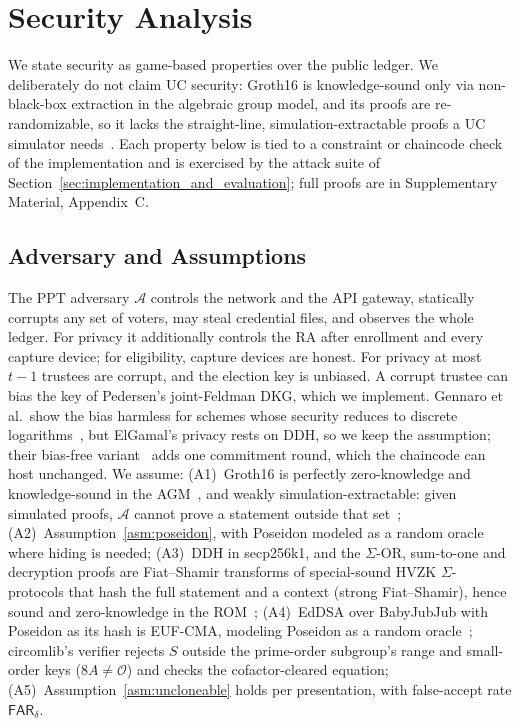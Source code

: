 \documentclass[10pt,letterpaper,journal]{IEEEtran}
\begin{document}
\section{Security Analysis}
\label{sec:security}

We state security as game-based properties over the public ledger. We deliberately do not claim UC security: Groth16 is knowledge-sound only via non-black-box extraction in the algebraic group model, and its proofs are re-randomizable, so it lacks the straight-line, simulation-extractable proofs a UC simulator needs~\cite{Baghery2021}. Each property below is tied to a constraint or chaincode check of the implementation and is exercised by the attack suite of Section~\ref{sec:implementation_and_evaluation}; full proofs are in Supplementary Material, Appendix~C.

\subsection{Adversary and Assumptions}
\label{sec:assumptions}
The PPT adversary $\mathcal{A}$ controls the network and the API gateway, statically corrupts any set of voters, may steal credential files, and observes the whole ledger. For privacy it additionally controls the RA after enrollment and every capture device; for eligibility, capture devices are honest. For privacy at most $t-1$ trustees are corrupt, and the election key is unbiased. A corrupt trustee can bias the key of Pedersen's joint-Feldman DKG, which we implement. Gennaro et al.\ show the bias harmless for schemes whose security reduces to discrete logarithms~\cite{Gennaro2003}, but ElGamal's privacy rests on DDH, so we keep the assumption; their bias-free variant~\cite{Gennaro2007} adds one commitment round, which the chaincode can host unchanged. We assume:
(A1)~Groth16 is perfectly zero-knowledge and knowledge-sound in the AGM~\cite{Groth2016,Fuchsbauer2018}, and weakly simulation-extractable: given simulated proofs, $\mathcal{A}$ cannot prove a statement outside that set~\cite{Baghery2021};
(A2)~Assumption~\ref{asm:poseidon}, with Poseidon modeled as a random oracle where hiding is needed;
(A3)~DDH in secp256k1, and the $\Sigma$-OR, sum-to-one and decryption proofs are Fiat--Shamir transforms of special-sound HVZK $\Sigma$-protocols that hash the full statement and a context (strong Fiat--Shamir), hence sound and zero-knowledge in the ROM~\cite{fiat1987how,Bernhard2012};
(A4)~EdDSA over BabyJubJub with Poseidon as its hash is EUF-CMA, modeling Poseidon as a random oracle~\cite{Bernstein2012}; circomlib's verifier rejects $S$ outside the prime-order subgroup's range and small-order keys ($8A \neq \mathcal{O}$) and checks the cofactor-cleared equation;
(A5)~Assumption~\ref{asm:uncloneable} holds per presentation, with false-accept rate $\mathsf{FAR}_\delta$.
\end{document}
